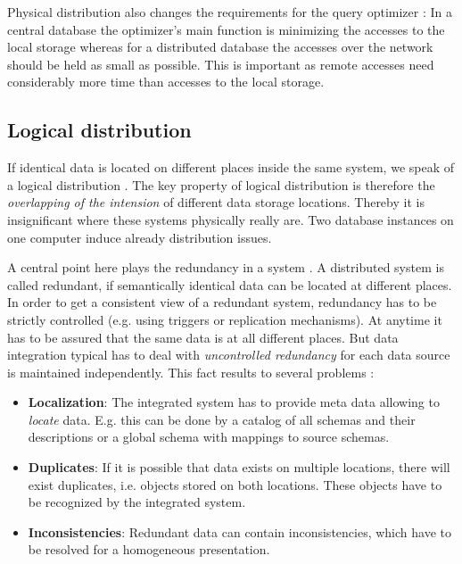 Physical distribution also changes the requirements for the query optimizer \cite[p. 52]{DBLP:books/dp/LeserN2006}: In a central database the optimizer's main function is minimizing  the accesses to the local storage whereas for a distributed database the accesses over the network should be held as small as possible. This is important as remote accesses need considerably more time than accesses to the local storage.  

\subsection{Logical distribution}
If identical data is located on different places inside the same system, we speak of a logical distribution \cite[p. 52]{DBLP:books/dp/LeserN2006}. The key property of logical distribution is therefore the \textit{overlapping of the intension} of different data storage locations. Thereby it is insignificant where these systems physically really are. Two database instances on one computer induce already distribution issues.

A central point here plays the redundancy in a system \cite[p. 53]{DBLP:books/dp/LeserN2006}. A distributed system is called redundant, if semantically identical data can be located at different places. In order to get a consistent view of a redundant system, redundancy has to be strictly controlled (e.g. using triggers or replication mechanisms). At anytime it has to be assured that the same data is at all different places. 
But data integration typical has to deal with \textit{uncontrolled redundancy} for each data source is maintained independently. This fact results to several problems \cite[p. 53]{DBLP:books/dp/LeserN2006}:
\begin{itemize}
\item \textbf{Localization}: The integrated system has to provide meta data allowing to \textit{locate} data. E.g. this can be done by a catalog of all schemas and their descriptions or a global schema with mappings to source schemas.
\item \textbf{Duplicates}: If it is possible that data exists on multiple locations, there will exist duplicates, i.e. objects stored on both locations. These objects have to be recognized by the integrated system.
\item \textbf{Inconsistencies}: Redundant data can contain inconsistencies, which have to be resolved for a homogeneous presentation.
\end{itemize}

